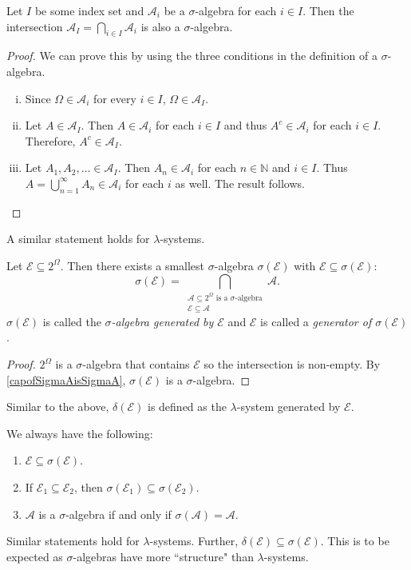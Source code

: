 \begin{theorem}
\label{capofSigmaAisSigmaA}
    Let $I$ be some index set and $\mathcal{A}_i$ be a $\sigma$-algebra for each $i\in I$. Then the intersection $\mathcal{A}_I=\bigcap_{i\in I}\mathcal{A}_i$ is also a $\sigma$-algebra.
\end{theorem}
\begin{proof}
    We can prove this by using the three conditions in the definition of a $\sigma$-algebra.
    \begin{enumerate}[(i)]
        \item Since $\Omega\in \mathcal{A}_i$ for every $i\in I$, $\Omega\in \mathcal{A}_I$.
        \item Let $A\in \mathcal{A}_I$. Then $A\in \mathcal{A}_i$ for each $i\in I$ and thus $A^c\in \mathcal{A}_i$ for each $i\in I$. Therefore, $A^c\in \mathcal{A}_I$.
        \item Let $A_1,A_2,\ldots\in \mathcal{A}_I$. Then $A_n\in\mathcal{A}_i$ for each $n\in\mathbb{N}$ and $i\in I$. Thus $A=\bigcup_{n=1}^\infty A_n\in\mathcal{A}_i$ for each $i$ as well. The result follows.
    \end{enumerate}
\end{proof}

A similar statement holds for $\lambda$-systems.

\begin{theorem}
    Let $\mathcal{E}\subseteq2^\Omega$. Then there exists a smallest $\sigma$-algebra $\sigma(\mathcal{E})$ with $\mathcal{E}\subseteq\sigma(\mathcal{E})$:
    $$\sigma(\mathcal{E})=\bigcap_{\substack{\mathcal{A}\subseteq2^\Omega\text{ is a $\sigma$-algebra} \\ \mathcal{E}\subseteq\mathcal{A}}}\mathcal{A}.$$
    $\sigma(\mathcal{E})$ is called the \textit{$\sigma$-algebra generated by $\mathcal{E}$} and $\mathcal{E}$ is called a \textit{generator of $\sigma(\mathcal{E})$}. 
\end{theorem}
\begin{proof}
    $2^\Omega$ is a $\sigma$-algebra that contains $\mathcal{E}$ so the intersection is non-empty. By \cref{capofSigmaAisSigmaA}, $\sigma(\mathcal{E})$ is a $\sigma$-algebra.
\end{proof}

Similar to the above, $\delta(\mathcal{E})$ is defined as the $\lambda$-system generated by $\mathcal{E}$.

\vspace{2mm}
We always have the following:
\begin{enumerate}
    \item $\mathcal{E}\subseteq \sigma(\mathcal{E})$.
    \item If $\mathcal{E}_1\subseteq\mathcal{E}_2$, then $\sigma(\mathcal{E}_1)\subseteq\sigma(\mathcal{E}_2)$.
    \item $\mathcal{A}$ is a $\sigma$-algebra if and only if $\sigma(\mathcal{A})=\mathcal{A}$.
\end{enumerate}
Similar statements hold for $\lambda$-systems. Further, $\delta(\mathcal{E})\subseteq\sigma(\mathcal{E})$. This is to be expected as $\sigma$-algebras have more ``structure" than $\lambda$-systems.

